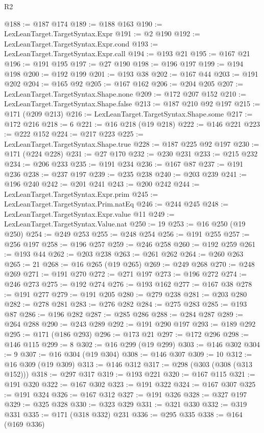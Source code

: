 \begin{lexlean}{R2}
\begin{coremodule}
@188 := @187 @174
@189 := @188 @163
@190 := LexLeanTarget.TargetSyntax.Expr
@191 := @2 @190
@192 := LexLeanTarget.TargetSyntax.Expr.cond
@193 := LexLeanTarget.TargetSyntax.Expr.call
@194 := @193 @21
@195 := @167 @21
@196 := @191 @195
@197 := @27 @190
@198 := @196 @197
@199 := @194 @198
@200 := @192 @199
@201 := @193 @38
@202 := @167 @44
@203 := @191 @202
@204 := @165 @92
@205 := @167 @162
@206 := @204 @205
@207 := LexLeanTarget.TargetSyntax.Shape.none
@209 := @172 @207 @152
@210 := LexLeanTarget.TargetSyntax.Shape.false
@213 := @187 @210 @92 @197
@215 := @171 (@209 @213)
@216 := LexLeanTarget.TargetSyntax.Shape.some
@217 := @172 @216
@218 := 6
@221 := @16 @218 (@19 @218)
@222 := @146 @221
@223 := @222 @152
@224 := @217 @223
@225 := LexLeanTarget.TargetSyntax.Shape.true
@228 := @187 @225 @92 @197
@230 := @171 (@224 @228)
@231 := @27 @170
@232 := @230 @231
@233 := @215 @232
@234 := @206 @233
@235 := @191 @234
@236 := @167 @87
@237 := @191 @236
@238 := @237 @197
@239 := @235 @238
@240 := @203 @239
@241 := @196 @240
@242 := @201 @241
@243 := @200 @242
@244 := LexLeanTarget.TargetSyntax.Expr.prim
@245 := LexLeanTarget.TargetSyntax.Prim.natEq
@246 := @244 @245
@248 := LexLeanTarget.TargetSyntax.Expr.value @11
@249 := LexLeanTarget.TargetSyntax.Value.nat
@250 := 19
@253 := @16 @250 (@19 @250)
@254 := @249 @253
@255 := @248 @254
@256 := @191 @255
@257 := @256 @197
@258 := @196 @257
@259 := @246 @258
@260 := @192 @259
@261 := @193 @44
@262 := @203 @238
@263 := @261 @262
@264 := @260 @263
@265 := 21
@268 := @16 @265 (@19 @265)
@269 := @249 @268
@270 := @248 @269
@271 := @191 @270
@272 := @271 @197
@273 := @196 @272
@274 := @246 @273
@275 := @192 @274
@276 := @193 @162
@277 := @167 @38
@278 := @191 @277
@279 := @191 @205
@280 := @279 @238
@281 := @203 @280
@282 := @278 @281
@283 := @276 @282
@284 := @275 @283
@285 := @193 @87
@286 := @196 @282
@287 := @285 @286
@288 := @284 @287
@289 := @264 @288
@290 := @243 @289
@292 := @191 @290 @197
@293 := @189 @292
@295 := @171 (@186 @293)
@296 := @173 @21
@297 := @172 @296
@298 := @146 @115
@299 := 8
@302 := @16 @299 (@19 @299)
@303 := @146 @302
@304 := 9
@307 := @16 @304 (@19 @304)
@308 := @146 @307
@309 := 10
@312 := @16 @309 (@19 @309)
@313 := @146 @312
@317 := @298 (@303 (@308 (@313 @152)))
@318 := @297 @317
@319 := @193 @221
@320 := @167 @115
@321 := @191 @320
@322 := @167 @302
@323 := @191 @322
@324 := @167 @307
@325 := @191 @324
@326 := @167 @312
@327 := @191 @326
@328 := @327 @197
@329 := @325 @328
@330 := @323 @329
@331 := @321 @330
@332 := @319 @331
@335 := @171 (@318 @332) @231
@336 := @295 @335
@338 := @164 (@169 @336)

\end{coremodule}
\end{lexlean}

